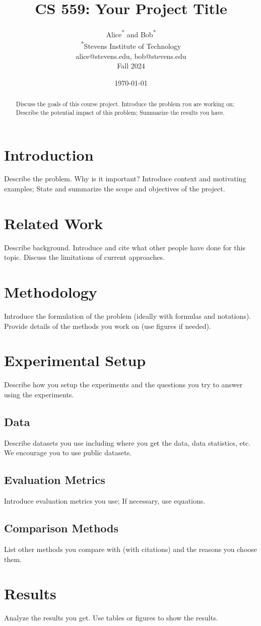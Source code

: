 \documentclass{article}
\title{CS 559: Your Project Title} %
\author{
Alice\textsuperscript{*} and Bob\textsuperscript{*}\\
\textsuperscript{*}{Stevens Institute of Technology}\\
alice@stevens.edu, bob@stevens.edu\\
Fall 2024
}
\date{\today}
\begin{document}
\maketitle
\begin{abstract}
Discuss the goals of this course project. Introduce the problem you are working on; Describe the potential impact of this problem; Summarize the results you have.
\end{abstract}

\section{Introduction}
Describe the problem. Why is it important? Introduce context and motivating examples; State and summarize the scope and objectives of the project.
\section{Related Work}
Describe background. Introduce and cite what other people have done for this topic. Discuss the limitations of current approaches.

\section{Methodology}
Introduce the formulation of the problem (ideally with formulas and notations). Provide details of the methods you work on (use figures if needed).

\section{Experimental Setup}
Describe how you setup the experiments and the questions you try to answer using the experiments.
\subsection{Data}
Describe datasets you use including where you get the data, data statistics, etc. We encourage you to use public datasets.
\subsection{Evaluation Metrics}
Introduce evaluation metrics you use; If necessary, use equations.
\subsection{Comparison Methods}
List other methods you compare with (with citations) and the reasons you choose them.

\section{Results}
Analyze the results you get. Use tables or figures to show the results.
\begin{footnotesize}


\end{footnotesize}%
\end{document}
